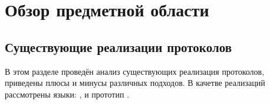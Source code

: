 \section{Обзор предметной области}





\subsection{Существующие реализации протоколов}
В этом разделе проведён анализ существующих реализация протоколов, приведены плюсы и минусы различных подходов. В качетве реализаций рассмотрены языки: ,  и прототип .




